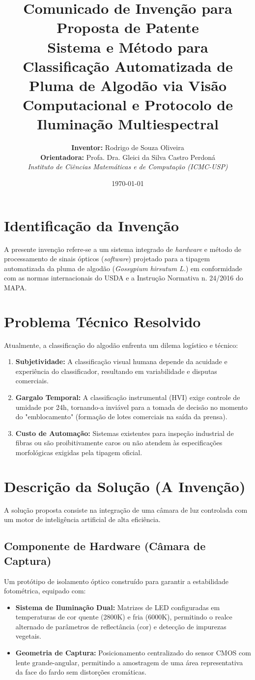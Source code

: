 \documentclass[12pt,a4paper]{article}
\title{
    \textbf{Comunicado de Invenção para Proposta de Patente} \\
    \large Sistema e Método para Classificação Automatizada de Pluma de Algodão via Visão Computacional e Protocolo de Iluminação Multiespectral
}
\author{
    \textbf{Inventor:} Rodrigo de Souza Oliveira \\
    \textbf{Orientadora:} Profa. Dra. Gleici da Silva Castro Perdoná \\
    \textit{Instituto de Ciências Matemáticas e de Computação (ICMC-USP)}
}
\date{\today}
\begin{document}
\maketitle

\section{Identificação da Invenção}
A presente invenção refere-se a um sistema integrado de \textit{hardware} e método de processamento de sinais ópticos (\textit{software}) projetado para a tipagem automatizada da pluma de algodão (\textit{Gossypium hirsutum L.}) em conformidade com as normas internacionais do USDA e a Instrução Normativa n. 24/2016 do MAPA.

\section{Problema Técnico Resolvido}
Atualmente, a classificação do algodão enfrenta um dilema logístico e técnico:
\begin{enumerate}
    \item \textbf{Subjetividade:} A classificação visual humana depende da acuidade e experiência do classificador, resultando em variabilidade e disputas comerciais.
    \item \textbf{Gargalo Temporal:} A classificação instrumental (HVI) exige controle de umidade por 24h, tornando-a inviável para a tomada de decisão no momento do "emblocamento" (formação de lotes comerciais na saída da prensa).
    \item \textbf{Custo de Automação:} Sistemas existentes para inspeção industrial de fibras ou são proibitivamente caros ou não atendem às especificações morfológicas exigidas pela tipagem oficial.
\end{enumerate}

\section{Descrição da Solução (A Invenção)}
A solução proposta consiste na integração de uma câmara de luz controlada com um motor de inteligência artificial de alta eficiência.

\subsection{Componente de Hardware (Câmara de Captura)}
Um protótipo de isolamento óptico construído para garantir a estabilidade fotométrica, equipado com:
\begin{itemize}
    \item \textbf{Sistema de Iluminação Dual:} Matrizes de LED configuradas em temperaturas de cor quente (2800K) e fria (6000K), permitindo o realce alternado de parâmetros de reflectância (cor) e detecção de impurezas vegetais.
    \item \textbf{Geometria de Captura:} Posicionamento centralizado do sensor CMOS com lente grande-angular, permitindo a amostragem de uma área representativa da face do fardo sem distorções cromáticas.
\end{itemize}
\end{document}
